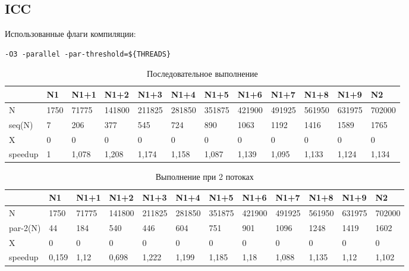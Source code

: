 \documentclass[a4paper,14pt,russian]{extarticle}
\begin{document}
\subsection{ICC}

Использованные флаги компиляции:
\begin{lstlisting}
-O3 -parallel -par-threshold=${THREADS}
\end{lstlisting}


\begin{table}[H]
	\caption{Последовательное выполнение}
	\label{icc-seq}
	\begin{adjustbox}{width=\textwidth,nofloat=table}
		\begin{tabular}{|l|l|l|l|l|l|l|l|l|l|l|l|}
			\hline
			& N1   & N1+1  & N1+2   & N1+3   & N1+4   & N1+5   & N1+6   & N1+7   & N1+8   & N1+9   & N2     \\\hline
N       & 1750 & 71775 & 141800 & 211825 & 281850 & 351875 & 421900 & 491925 & 561950 & 631975 & 702000 \\ \hline
seq(N)  & 7    & 206   & 377    & 545    & 724    & 890    & 1063   & 1192   & 1416   & 1589   & 1765   \\ \hline
X       & 0    & 0     & 0      & 0      & 0      & 0      & 0      & 0      & 0      & 0      & 0      \\ \hline
speedup & 1    & 1,078 & 1,208  & 1,174  & 1,158  & 1,087  & 1,139  & 1,095  & 1,133  & 1,124  & 1,134  \\ \hline
		\end{tabular}
	\end{adjustbox}
\end{table}

\begin{table}[H]
	\caption{Выполнение при 2 потоках}
	\label{icc-2}
	\begin{adjustbox}{width=\textwidth,nofloat=table}
		\begin{tabular}{|l|l|l|l|l|l|l|l|l|l|l|l|}
			\hline
			& N1   & N1+1  & N1+2   & N1+3   & N1+4   & N1+5   & N1+6   & N1+7   & N1+8   & N1+9   & N2     \\\hline
N        & 1750  & 71775 & 141800 & 211825 & 281850 & 351875 & 421900 & 491925 & 561950 & 631975 & 702000 \\ \hline
par-2(N) & 44    & 184   & 540    & 446    & 604    & 751    & 901    & 1096   & 1248   & 1419   & 1602   \\ \hline
X        & 0     & 0     & 0      & 0      & 0      & 0      & 0      & 0      & 0      & 0      & 0      \\ \hline
speedup  & 0,159 & 1,12  & 0,698  & 1,222  & 1,199  & 1,185  & 1,18   & 1,088  & 1,135  & 1,12   & 1,102  \\ \hline
		\end{tabular}
	\end{adjustbox}
\end{table}
\end{document}
